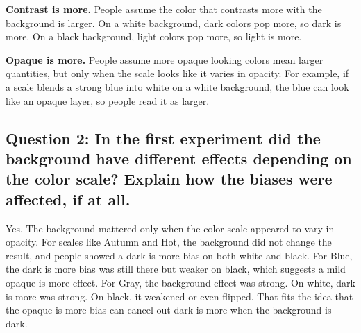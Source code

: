 \documentclass[11pt]{article}
\begin{document}
\textbf{Contrast is more.} People assume the color that contrasts more with the background is larger. On a white background, dark colors pop more, so dark is more. On a black background, light colors pop more, so light is more.

\textbf{Opaque is more.} People assume more opaque looking colors mean larger quantities, but only when the scale looks like it varies in opacity. For example, if a scale blends a strong blue into white on a white background, the blue can look like an opaque layer, so people read it as larger.

\subsection*{Question 2: In the first experiment did the background have different effects depending on the color scale? Explain how the biases were affected, if at all.}

Yes. The background mattered only when the color scale appeared to vary in opacity. For scales like Autumn and Hot, the background did not change the result, and people showed a dark is more bias on both white and black. For Blue, the dark is more bias was still there but weaker on black, which suggests a mild opaque is more effect. For Gray, the background effect was strong. On white, dark is more was strong. On black, it weakened or even flipped. That fits the idea that the opaque is more bias can cancel out dark is more when the background is dark.
\end{document}
